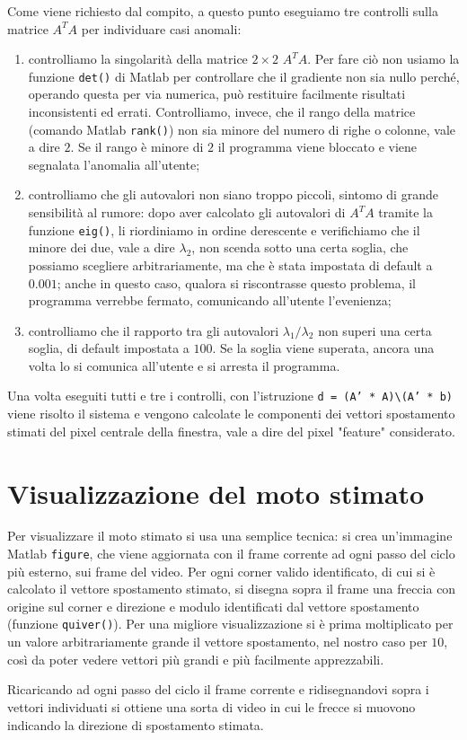 \documentclass[11pt, twocolumn]{article}
\begin{document}
Come viene richiesto dal compito, a questo punto eseguiamo tre controlli sulla matrice $A^T A$ per individuare casi anomali:
\begin{enumerate}
\item
controlliamo la singolarità della matrice $2 \times 2$ $A^TA$. Per fare ciò non usiamo la funzione \texttt{det()} di Matlab per controllare che il gradiente non sia nullo perché, operando questa per via numerica, può restituire facilmente risultati inconsistenti ed errati. Controlliamo, invece, che il rango della matrice (comando Matlab \texttt{rank()}) non sia minore del numero di righe o colonne, vale a dire $2$. Se il rango è minore di $2$ il programma viene bloccato e viene segnalata l'anomalia all'utente;

\item
controlliamo che gli autovalori non siano troppo piccoli, sintomo di grande sensibilità al rumore: dopo aver calcolato gli autovalori di $A^TA$ tramite la funzione \texttt{eig()}, li riordiniamo in ordine derescente e verifichiamo che il minore dei due, vale a dire $\lambda_2$, non scenda sotto una certa soglia, che possiamo scegliere arbitrariamente, ma che è stata impostata di default a $0.001$; anche in questo caso, qualora si riscontrasse questo problema, il programma verrebbe fermato, comunicando all'utente l'evenienza;

\item
controlliamo che il rapporto tra gli autovalori $\lambda_1 / \lambda_2$ non superi una certa soglia, di default impostata a $100$. Se la soglia viene superata, ancora una volta lo si comunica all'utente e si arresta il programma.
\end{enumerate}

Una volta eseguiti tutti e tre i controlli, con l'istruzione \texttt{d = (A' * A)\textbackslash (A' * b)} viene risolto il sistema e vengono calcolate le componenti dei vettori spostamento stimati del pixel centrale della finestra, vale a dire del pixel "feature" considerato.

\section*{Visualizzazione del moto stimato}
Per visualizzare il moto stimato si usa una semplice tecnica: si crea un'immagine Matlab \texttt{figure}, che viene aggiornata con il frame corrente ad ogni passo del ciclo più esterno, sui frame del video. Per ogni corner valido identificato, di cui si è calcolato il vettore spostamento stimato, si disegna sopra il frame una freccia con origine sul corner e direzione e modulo identificati dal vettore spostamento (funzione \texttt{quiver()}). Per una migliore visualizzazione si è prima moltiplicato per un valore arbitrariamente grande il vettore spostamento, nel nostro caso per $10$, così da poter vedere vettori più grandi e più facilmente apprezzabili.

Ricaricando ad ogni passo del ciclo il frame corrente e ridisegnandovi sopra i vettori individuati si ottiene una sorta di video in cui le frecce si muovono indicando la direzione di spostamento stimata.
\end{document}
